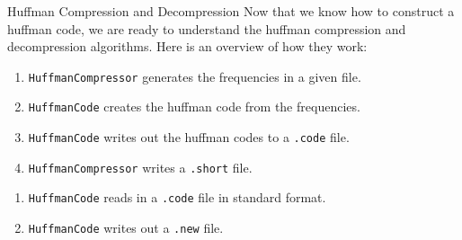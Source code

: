 \documentclass[programming]{../../mfcs}
\begin{document}
\begin{question}{Huffman Compression and Decompression}
Now that we know how to construct a huffman code, we are ready to understand the huffman
compression and decompression algorithms.  Here is an overview of how they work:


\vspace{0.1em}

\begin{minipage}{0.3\textwidth}
\end{minipage}
\hfill
\begin{minipage}{0.65\textwidth}
\vspace{0.5em}
{\small \begin{enumerate}[(1)]\setlength{\itemindent}{-1em}
    \item \texttt{HuffmanCompressor} generates the frequencies in a given file.
    \item \texttt{HuffmanCode} creates the huffman code from the frequencies.
    \item \texttt{HuffmanCode} writes out the huffman codes to a \texttt{.code} file.
    \item \texttt{HuffmanCompressor} writes a \texttt{.short} file.
\end{enumerate}}

\vspace{0.5em}
{\small \begin{enumerate}[(1)]\setlength{\itemindent}{-1em}
    \item \texttt{HuffmanCode} reads in a \texttt{.code} file in standard format.
    \item \texttt{HuffmanCode} writes out a \texttt{.new} file.
\end{enumerate}}

\end{minipage}



\end{question}
\newpage
\end{document}
